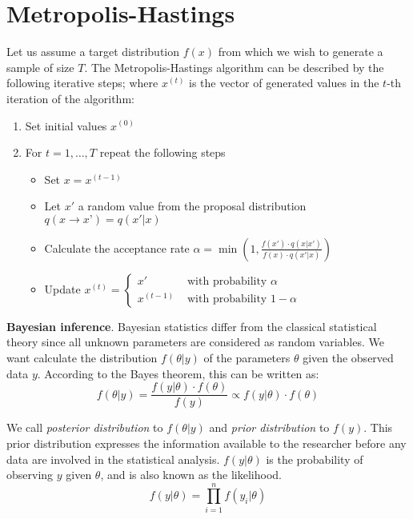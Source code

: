 \documentclass[11pt,fleqn]{book} %
\begin{document}
\section{Metropolis-Hastings}

\begin{algorithm}
Let us assume a target distribution $f(x)$ from which we wish to generate a 
sample of size $T$. The Metropolis-Hastings algorithm can be described by the 
following iterative steps; where $x^{(t)}$ is the vector of generated values 
in the $t$-th iteration of the algorithm:
\begin{enumerate}
\item Set initial values $x^{(0)}$
\item For $t=1,\dots,T$ repeat the following steps
\begin{itemize}
\item Set $x=x^{(t-1)}$
\item Let $x'$ a random value from the proposal distribution $q(x \to x’)=q(x'|x)$
\item Calculate the acceptance rate 
      $\alpha = \min\left(1,\frac{f(x') \cdot q(x|x')}{f(x) \cdot q(x'|x)}\right)$
\item Update $x^{(t)}=\left\{
  \begin{array}{ll}
  x' & \text{ with probability } \alpha \\
  x^{(t-1)}  & \text{ with probability } 1-\alpha
  \end{array}\right.$ 
\end{itemize}
\end{enumerate}
\end{algorithm}



\textbf{Bayesian inference}.
Bayesian statistics differ from the classical statistical theory since all 
unknown parameters are considered as random variables.
We want calculate the distribution $f(\theta|y)$ of the parameters $\theta$ 
given the observed data $y$. According to the Bayes theorem, this can be 
written as:
\begin{displaymath}
f(\theta|y) = \frac{f(y|\theta) \cdot f(\theta)}{f(y)} \propto f(y|\theta) \cdot f(\theta)
\end{displaymath}

We call \emph{posterior distribution} to $f(\theta|y)$ and \emph{prior distribution} 
to $f(y)$. This prior distribution expresses the information available to the 
researcher before any data are involved in the statistical analysis. 
$f(y|\theta)$ is the probability of observing $y$ given $\theta$, and is also 
known as the likelihood.
\begin{displaymath}
f(y|\theta) = \prod_{i=1}^n f(y_i|\theta)
\end{displaymath}
\end{document}
